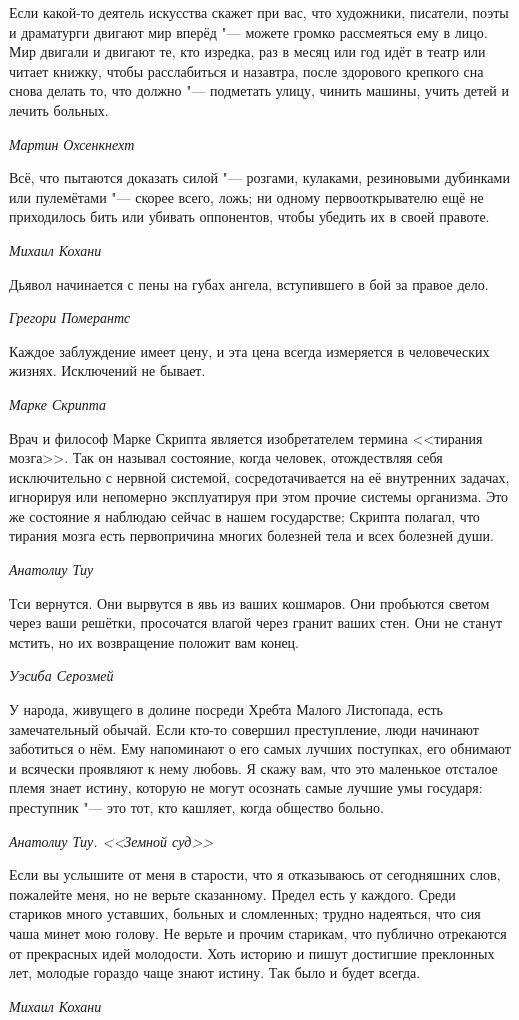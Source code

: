 \documentclass[a4paper,10pt,fleqn]{book}
\begin{document}
\epigraph{Если какой-то деятель искусства скажет при вас, что художники, писатели, поэты и драматурги двигают мир вперёд "--- можете громко рассмеяться ему в лицо.
Мир двигали и двигают те, кто изредка, раз в месяц или год идёт в театр или читает книжку, чтобы расслабиться и назавтра, после здорового крепкого сна снова делать то, что должно "--- подметать улицу, чинить машины, учить детей и лечить больных.}
{\textit{Мартин Охсенкнехт}}

\epigraph{Всё, что пытаются доказать силой "--- розгами, кулаками, резиновыми дубинками или пулемётами "--- скорее всего, ложь;
ни одному первооткрывателю ещё не приходилось бить или убивать оппонентов, чтобы убедить их в своей правоте.}
{\textit{Михаил Кохани}}

\epigraph{Дьявол начинается с пены на губах ангела, вступившего в бой за правое дело.}
{\textit{Грегори Померантс}}

\epigraph{Каждое заблуждение имеет цену, и эта цена всегда измеряется в человеческих жизнях.
Исключений не бывает.}
{\textit{Марке Скрипта}}

\epigraph{Врач и философ Марке Скрипта является изобретателем термина <<тирания мозга>>.
Так он называл состояние, когда человек, отождествляя себя исключительно с нервной системой, сосредотачивается на её внутренних задачах, игнорируя или непомерно эксплуатируя при этом прочие системы организма.
Это же состояние я наблюдаю сейчас в нашем государстве;
Скрипта полагал, что тирания мозга есть первопричина многих болезней тела и всех болезней души.}
{\textit{Анатолиу Тиу}}

\epigraph{Тси вернутся.
Они вырвутся в явь из ваших кошмаров.
Они пробьются светом через ваши решётки, просочатся влагой через гранит ваших стен.
Они не станут мстить, но их возвращение положит вам конец.}
{\textit{Уэсиба Серозмей}}

\epigraph{У народа, живущего в долине посреди Хребта Малого Листопада, есть замечательный обычай.
Если кто-то совершил преступление, люди начинают заботиться о нём.
Ему напоминают о его самых лучших поступках, его обнимают и всячески проявляют к нему любовь.
Я скажу вам, что это маленькое отсталое племя знает истину, которую не могут осознать самые лучшие умы государя: преступник "--- это тот, кто кашляет, когда общество больно.}
{\textit{Анатолиу Тиу. <<Земной суд>>}}

\epigraph{Если вы услышите от меня в старости, что я отказываюсь от сегодняшних слов, пожалейте меня, но не верьте сказанному.
Предел есть у каждого.
Среди стариков много уставших, больных и сломленных;
трудно надеяться, что сия чаша минет мою голову.
Не верьте и прочим старикам, что публично отрекаются от прекрасных идей молодости.
Хоть историю и пишут достигшие преклонных лет, молодые гораздо чаще знают истину.
Так было и будет всегда.}
{\textit{Михаил Кохани}}
\end{document}
